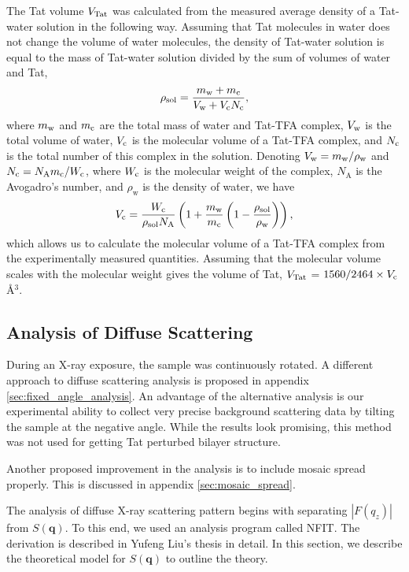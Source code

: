 The Tat volume $V_\textrm{Tat}$ was calculated from the measured average density of a 
Tat-water solution in the following way. Assuming that Tat
molecules in water does not change the volume of water molecules, the density
of Tat-water solution is equal to the mass of Tat-water solution divided
by the sum of volumes of water and Tat, 
\begin{equation}
  \rho_\textrm{sol} = \frac{m_\textrm{w}+m_\textrm{c}}{V_\textrm{w}+V_\textrm{c}N_\textrm{c}},
\end{equation}
where $m_\textrm{w}$ and 
$m_\textrm{c}$
are the total mass of water and Tat-TFA complex, $V_\textrm{w}$ is the total volume of 
water, $V_\textrm{c}$ is the molecular volume of a Tat-TFA complex, and $N_\textrm{c}$ is the total number 
of this complex in the solution. 
Denoting $V_\textrm{w}=m_\textrm{w}/\rho_\textrm{w}$ 
and $N_\textrm{c}=N_\textrm{A}m_\textrm{c}/W_\textrm{c}$, 
where $W_\textrm{c}$ is the molecular weight of the complex, 
$N_\textrm{A}$ is the Avogadro's number,
and $\rho_\textrm{w}$ is the density of water, we have
\begin{equation}
  V_\textrm{c} = \frac{W_\textrm{c}}{\rho_\textrm{sol}N_\textrm{A}} \left( 
        1 + \frac{m_\textrm{w}}{m_\textrm{c}}\left(1-\frac{\rho_\textrm{sol}}{\rho_\textrm{w}}\right) 
        \right),
\end{equation}
which allows us to calculate the molecular volume of a Tat-TFA complex 
from the experimentally measured quantities. 
Assuming that the molecular
volume scales with the molecular weight gives the volume of Tat, 
$V_\textrm{Tat}$ = $1560/2464\times V_\textrm{c}$ \AA$^3$. 

\subsection{Analysis of Diffuse Scattering}
During an X-ray exposure, the sample was continuously rotated. A different
approach to diffuse scattering analysis is proposed in 
appendix \ref{sec:fixed_angle_analysis}. An advantage of the alternative
analysis is our experimental ability to collect very precise background
scattering data by tilting the sample at the negative angle. While
the results look promising, this method was not used for getting 
Tat perturbed bilayer structure.

Another proposed improvement in the analysis is to include mosaic spread
properly. This is discussed in appendix \ref{sec:mosaic_spread}.

The analysis of diffuse X-ray scattering pattern begins with separating 
$|F(q_z)|$ from $S(\mathbf{q})$. To this end, we used an analysis program
called NFIT. The derivation is described in Yufeng Liu's thesis in detail. 
In this section, we describe the theoretical model for $S(\mathbf{q})$ to 
outline the theory. 

